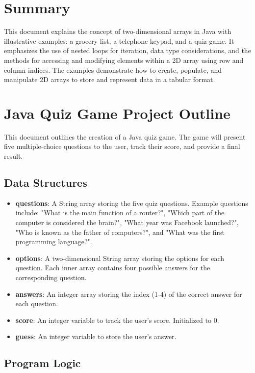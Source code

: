 \documentclass{article}
\begin{document}
\section{Summary}

This document explains the concept of two-dimensional arrays in Java with illustrative examples: a grocery list, a telephone keypad, and a quiz game.  It emphasizes the use of nested loops for iteration, data type considerations, and the methods for accessing and modifying elements within a 2D array using row and column indices.  The examples demonstrate how to create, populate, and manipulate 2D arrays to store and represent data in a tabular format.


\section{Java Quiz Game Project Outline}

This document outlines the creation of a Java quiz game.  The game will present five multiple-choice questions to the user, track their score, and provide a final result.

\subsection{Data Structures}

\begin{itemize}
    \item \textbf{questions}: A String array storing the five quiz questions.  Example questions include:  "What is the main function of a router?", "Which part of the computer is considered the brain?", "What year was Facebook launched?", "Who is known as the father of computers?", and "What was the first programming language?".
    \item \textbf{options}: A two-dimensional String array storing the options for each question. Each inner array contains four possible answers for the corresponding question.
    \item \textbf{answers}: An integer array storing the index (1-4) of the correct answer for each question.
    \item \textbf{score}: An integer variable to track the user's score. Initialized to 0.
    \item \textbf{guess}: An integer variable to store the user's answer.
\end{itemize}

\subsection{Program Logic}
\end{document}
